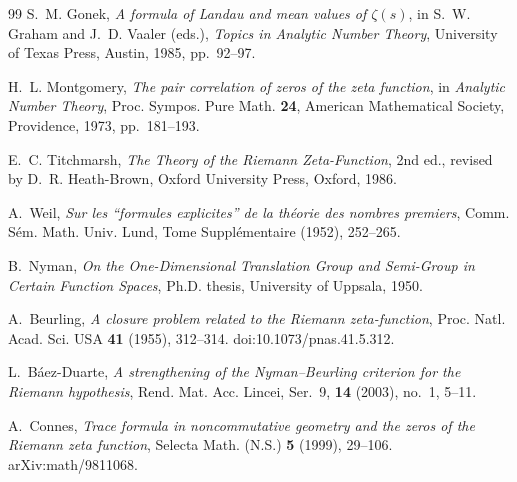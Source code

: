 \documentclass[11pt]{amsart}
\numberwithin{equation}{section}
\theoremstyle{plain}
\theoremstyle{definition}
\theoremstyle{remark}
\newcommand{\1}{\mathbf{1}}
\begin{document}
\begin{thebibliography}{99}
S.~M. Gonek,
\emph{A formula of Landau and mean values of \(\zeta(s)\)},
in S.~W. Graham and J.~D. Vaaler (eds.),
\emph{Topics in Analytic Number Theory},
University of Texas Press, Austin, 1985, pp.~92--97.


H.~L. Montgomery,
\emph{The pair correlation of zeros of the zeta function},
in \emph{Analytic Number Theory},
Proc. Sympos. Pure Math. \textbf{24},
American Mathematical Society, Providence, 1973, pp.~181--193.

E.~C. Titchmarsh,
\emph{The Theory of the Riemann Zeta-Function},
2nd ed., revised by D.~R. Heath-Brown,
Oxford University Press, Oxford, 1986.

A.~Weil,
\emph{Sur les ``formules explicites'' de la théorie des nombres premiers},
Comm. Sém. Math. Univ. Lund, Tome Supplémentaire (1952), 252--265.


B.~Nyman,
\emph{On the One-Dimensional Translation Group and Semi-Group in Certain
Function Spaces},
Ph.D. thesis, University of Uppsala, 1950.

A.~Beurling,
\emph{A closure problem related to the Riemann zeta-function},
Proc. Natl. Acad. Sci. USA \textbf{41} (1955), 312--314.
doi:10.1073/pnas.41.5.312.

L.~B\'aez-Duarte,
\emph{A strengthening of the Nyman--Beurling criterion for the Riemann
hypothesis},
Rend. Mat. Acc. Lincei, Ser.~9, \textbf{14} (2003), no.~1, 5--11.

A.~Connes,
\emph{Trace formula in noncommutative geometry and the zeros of the Riemann
zeta function},
Selecta Math. (N.S.) \textbf{5} (1999), 29--106.
arXiv:math/9811068.

\end{thebibliography}
\end{document}
